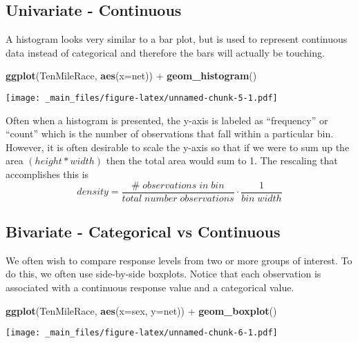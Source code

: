\documentclass[]{book}
\newenvironment{Shaded}{\begin{snugshade}}{\end{snugshade}}
\newcommand{\KeywordTok}[1]{\textcolor[rgb]{0.13,0.29,0.53}{\textbf{{#1}}}}
\newcommand{\DataTypeTok}[1]{\textcolor[rgb]{0.13,0.29,0.53}{{#1}}}
\newcommand{\StringTok}[1]{\textcolor[rgb]{0.31,0.60,0.02}{{#1}}}
\newcommand{\NormalTok}[1]{{#1}}
\begin{document}
\subsection{Univariate - Continuous}\label{univariate---continuous}

A histogram looks very similar to a bar plot, but is used to represent
continuous data instead of categorical and therefore the bars will
actually be touching.

\begin{Shaded}
\begin{Highlighting}[]
\KeywordTok{ggplot}\NormalTok{(TenMileRace, }\KeywordTok{aes}\NormalTok{(}\DataTypeTok{x=}\NormalTok{net)) +}\StringTok{ }\KeywordTok{geom_histogram}\NormalTok{()}
\end{Highlighting}
\end{Shaded}

\texttt{[image: \_main\_files/figure-latex/unnamed-chunk-5-1.pdf]}

Often when a histogram is presented, the y-axis is labeled as
``frequency'' or ``count'' which is the number of observations that fall
within a particular bin. However, it is often desirable to scale the
y-axis so that if we were to sum up the area \((height * width)\) then
the total area would sum to 1. The rescaling that accomplishes this is
\[density=\frac{\#\;observations\;in\;bin}{total\;number\;observations}\cdot\frac{1}{bin\;width}\]

\subsection{Bivariate - Categorical vs
Continuous}\label{bivariate---categorical-vs-continuous}

We often wish to compare response levels from two or more groups of
interest. To do this, we often use side-by-side boxplots. Notice that
each observation is associated with a continuous response value and a
categorical value.

\begin{Shaded}
\begin{Highlighting}[]
\KeywordTok{ggplot}\NormalTok{(TenMileRace, }\KeywordTok{aes}\NormalTok{(}\DataTypeTok{x=}\NormalTok{sex, }\DataTypeTok{y=}\NormalTok{net)) +}\StringTok{ }\KeywordTok{geom_boxplot}\NormalTok{()}
\end{Highlighting}
\end{Shaded}

\texttt{[image: \_main\_files/figure-latex/unnamed-chunk-6-1.pdf]}
\end{document}
